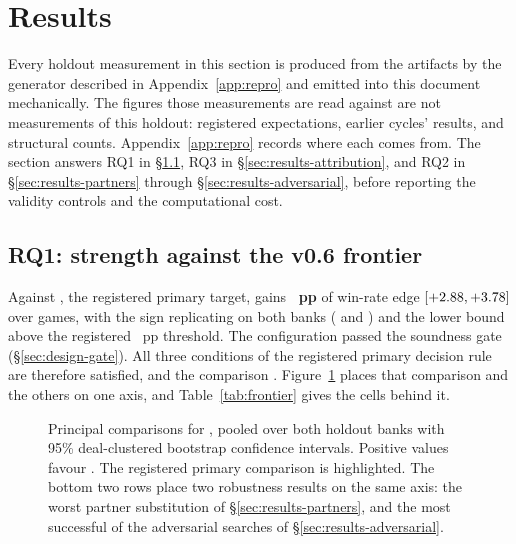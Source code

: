 \section{Results}
\label{sec:results}

Every holdout measurement in this section is produced from the artifacts by the generator
described in Appendix~\ref{app:repro} and emitted into this document mechanically. The figures those
measurements are read against are not measurements of this holdout: registered expectations,
earlier cycles' results, and structural counts. Appendix~\ref{app:repro} records where each comes
from. The section answers RQ1 in
\S\ref{sec:results-primary}, RQ3 in \S\ref{sec:results-attribution}, and RQ2 in
\S\ref{sec:results-partners} through \S\ref{sec:results-adversarial}, before reporting the validity
controls and the computational cost.

\subsection{RQ1: strength against the v0.6 frontier}
\label{sec:results-primary}

Against \fcheap{}, the registered primary target, \sestina{} gains
\textbf{\vsevenBtwoFcheapMag{}~pp} of win-rate edge $[+2.88, +3.78]$ over
\vsevenBtwoFcheapN{} games, with the sign replicating on both banks
(\vsevenBtwoFcheapBankOne{} and \vsevenBtwoFcheapBankTwo{}) and the lower bound above the registered
\vsevenPrimaryFloor{}~pp threshold. The configuration passed the soundness gate
(\S\ref{sec:design-gate}). All three conditions of the registered primary decision rule are therefore
satisfied, and the comparison \vsevenPrimaryVerdict{}. Figure~\ref{fig:forest} places that
comparison and the others on one axis, and Table~\ref{tab:frontier} gives the cells behind it.

\begin{figure}[!ht]\centering
{\tabfont}
\caption{Principal comparisons for \sestina{}, pooled over both holdout banks with 95\%
deal-clustered bootstrap confidence intervals. Positive values favour \sestina{}. The registered
primary comparison is highlighted. The bottom two rows place two robustness results on the same
axis: the worst partner substitution of \S\ref{sec:results-partners}, and the most successful of the
\vsevenBfourArms{} adversarial searches of \S\ref{sec:results-adversarial}.}
\label{fig:forest}
\end{figure}

